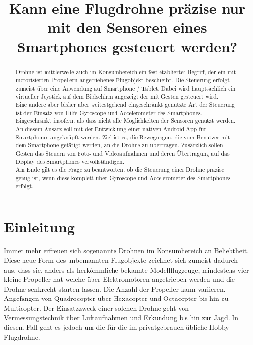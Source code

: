 \documentclass{article}
\title{Kann eine Flugdrohne präzise nur mit den Sensoren eines Smartphones gesteuert werden?}
\begin{document}
\maketitle
\begin{abstract}
Drohne ist mittlerweile auch im Konsumbereich ein fest etablierter Begriff, der ein mit motorisierten Propellern angetriebenes Flugobjekt beschreibt. Die Steuerung erfolgt zumeist über eine Anwendung auf Smartphone / Tablet. Dabei wird hauptsächlich ein virtueller Joystick auf dem Bildschirm angezeigt der mit Gesten gesteuert wird.\\ Eine andere aber bisher aber weitestgehend eingeschränkt genutzte Art der Steuerung ist der Einsatz von Hilfe Gyroscope und Accelerometer des Smartphones. Eingeschränkt insofern, als dass nicht alle Möglichkeiten der Sensoren genutzt werden. An diesem Ansatz soll mit der Entwicklung einer nativen Android App für Smartphones angeknüpft werden. Ziel ist es, die Bewegungen, die vom Benutzer mit dem Smartphone getätigt werden, an die Drohne zu übertragen. Zusätzlich sollen Gesten das Steuern von Foto- und Videoaufnahmen und deren Übertragung auf das Display des Smartphones vervollständigen.\\ Am Ende gilt es die Frage zu beantworten, ob die Steuerung einer Drohne präzise genug ist, wenn diese komplett über Gyroscope und Accelerometer des Smartphones erfolgt.

\end{abstract}

\section{Einleitung}
\label{sec:einleitung}
Immer mehr erfreuen sich sogenannte Drohnen im Konsumbereich an Beliebtheit. Diese neue Form des unbemannten Flugobjekte zeichnet sich zumeist dadurch aus, dass sie, anders als herkömmliche bekannte Modellflugzeuge, mindestens vier kleine Propeller hat welche über Elektromotoren angetrieben werden und die Drohne senkrecht starten lassen. Die Anzahl der Propeller kann variieren. Angefangen von Quadrocopter über Hexacopter und Octacopter bis hin zu Multicopter. Der Einsatzzweck einer solchen Drohne geht von Vermessungstechnik über Luftaufnahmen und Erkundung bis hin zur Jagd. In diesem Fall geht es jedoch um die für die im privatgebrauch übliche Hobby-Flugdrohne.
\end{document}
